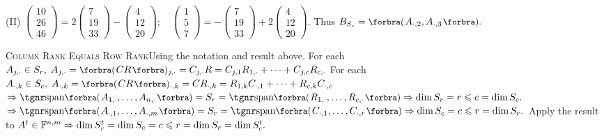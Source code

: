 (II) {\normalsize$\begin{pmatrix} 10\\[-2pt] 26\\[-2pt] 46\end{pmatrix}=2\begin{pmatrix} 7\\[-2pt] 19\\[-2pt] 33\end{pmatrix}-\begin{pmatrix} 4\\[-2pt] 12\\[-2pt] 20\end{pmatrix}; \quad \begin{pmatrix} 1\\[-2pt] 5\\[-2pt] 7\end{pmatrix}=-\begin{pmatrix} 7\\[-2pt] 19\\[-2pt] 33\end{pmatrix}+2\begin{pmatrix} 4\\[-2pt] 12\\[-2pt] 20\end{pmatrix}$}. \;Thus $B_{S_c}=\BigPar{A_{\cdot,2},A_{\cdot,3}}.$\vspace{6pt}\par
\SepLine\pagebreak

\BulletPointX\textsc{Column Rank Equals Row Rank}\quad Using the notation and result above.\TextB{}
For each $A_{j,\cdot}\in S_r,\;A_{j,\cdot}=\BigPar{CR}{_{j,\cdot}}=C_{j,\cdot}R=C_{j,1}R_{1,\cdot}+\dots+C_{j,c}R_{c,\cdot}$\TextB{}
For each $A_{\cdot,k}\in S_c,\;A_{\cdot,k}=\BigPar{CR}{_{\cdot,k}}=CR_{\cdot,k}=R_{1,k}C_{\cdot,1}+\dots+R_{c,k}C_{\cdot,c}$\TextB{}
$\Rightarrow\Span[\BigPar]{A_{1,\cdot},\dots,A_{n,\cdot}}=S_r=\Span[\BigPar]{R_{1,\cdot},\dots,R_{c,\cdot}}\Rightarrow\dim S_r=r\leqslant c=\dim S_c.$\TextB{}
$\Rightarrow\Span[\BigPar]{A_{\cdot,1},\dots,A_{\cdot,m}}=S_r=\Span[\BigPar]{C_{\cdot,1},\dots,C_{\cdot,r}}\Rightarrow\dim S_c=c\leqslant r=\dim S_r.$\TextB{}
\Or Apply the result to $A^t\in{\mathbb{F}}^{n,m}\Rightarrow\dim S_r^t=\dim S_c=c\leqslant r=\dim S_r=\dim S_c^t.$\PfEnd
\SepLine

\def\rank{{\textup{\tgnr rank}}\,}

